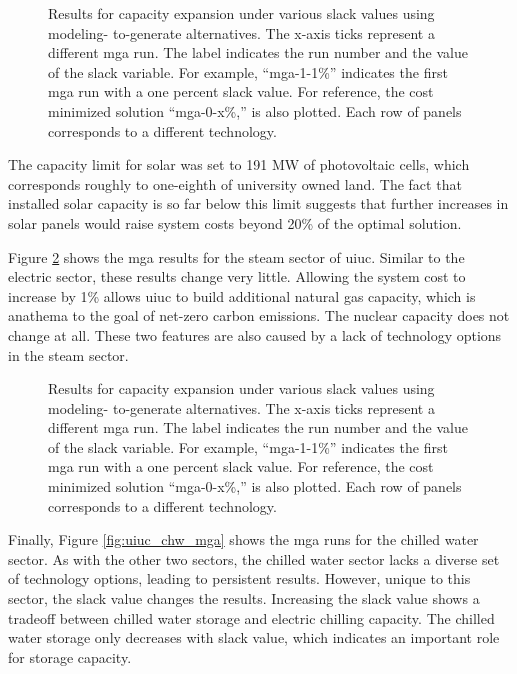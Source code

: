 \begin{figure}[H]
  \centering
  \resizebox{0.95\columnwidth}{!}{}
  \caption{Results for capacity expansion under various slack values using modeling-
  to-generate alternatives. The x-axis ticks represent a different \gls{mga} run.
  The label indicates the run number and the value of the slack variable. For example,
  ``mga-1-1\%'' indicates the first \gls{mga} run with a one percent
  slack value. For reference, the cost minimized solution ``mga-0-x\%,'' is also
  plotted. Each row of panels corresponds to a different technology.}
  \label{fig:uiuc_elc_mga}
\end{figure}

The capacity limit for solar was set to 191 MW of photovoltaic cells, which corresponds
roughly to one-eighth of university owned land. The fact that installed solar capacity
is so far below this limit suggests that further increases in solar panels would
raise system costs beyond 20\% of the optimal solution.

Figure \ref{fig:uiuc_thm_mga} shows the \gls{mga} results for the steam sector
of \gls{uiuc}. Similar to the electric sector, these results change very little.
Allowing the system cost to increase by 1\% allows \gls{uiuc} to build additional
natural gas capacity, which is anathema to the goal of net-zero carbon emissions.
The nuclear capacity does not change at all. These two features are also caused
by a lack of technology options in the steam sector.


\begin{figure}[H]
  \centering
  \resizebox{0.95\columnwidth}{!}{}
  \caption{Results for capacity expansion under various slack values using modeling-
  to-generate alternatives. The x-axis ticks represent a different \gls{mga} run.
  The label indicates the run number and the value of the slack variable. For example,
  ``mga-1-1\%'' indicates the first \gls{mga} run with a one percent
  slack value. For reference, the cost minimized solution ``mga-0-x\%,'' is also
  plotted. Each row of panels corresponds to a different technology.}
  \label{fig:uiuc_thm_mga}
\end{figure}

Finally, Figure \ref{fig:uiuc_chw_mga} shows the \gls{mga} runs for the chilled
water sector. As with the other two sectors, the chilled water sector lacks a
diverse set of technology options, leading to persistent results. However,
unique to this sector, the slack value changes the results. Increasing the slack
value shows a tradeoff between chilled water storage and electric chilling capacity.
The chilled water storage only decreases with slack value, which indicates an
important role for storage capacity.


